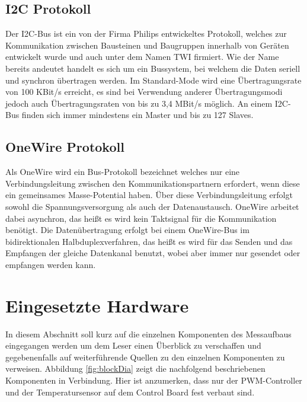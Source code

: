 \documentclass[a4paper,12pt]{scrartcl}
\begin{document}
\subsection{I2C Protokoll}

Der I2C-Bus ist ein von der Firma Philips entwickeltes Protokoll, welches zur Kommunikation zwischen Bausteinen und Baugruppen innerhalb von Geräten entwickelt wurde und auch unter dem Namen TWI firmiert. Wie der Name bereits andeutet handelt es sich um ein Bussystem, bei welchem die Daten seriell und synchron übertragen werden. Im Standard-Mode wird eine Übertragungsrate von 100 KBit/s erreicht, es sind bei Verwendung anderer Übertragungsmodi jedoch
auch Übertragungsraten von bis zu 3,4 MBit/s möglich. An einem I2C-Bus finden sich immer mindestens ein Master und bis zu 127 Slaves.\cite{speci2c}

\subsection{OneWire Protokoll}
Als OneWire wird ein Bus-Protokoll bezeichnet welches nur eine Verbindungsleitung zwischen den Kommunikationspartnern erfordert, wenn diese ein gemeinsames Masse-Potential haben. Über diese Verbindungsleitung erfolgt sowohl die Spannungsversorgung als auch der Datenaustausch. OneWire arbeitet dabei asynchron, das heißt es wird kein Taktsignal für die Kommunikation benötigt. Die Datenübertragung erfolgt bei einem OneWire-Bus im bidirektionalen Halbduplexverfahren, das heißt es wird für das Senden und das Empfangen der gleiche Datenkanal benutzt, wobei aber immer nur gesendet oder empfangen werden kann.\cite{spec1wire}

\clearpage
\section{Eingesetzte Hardware}
In diesem Abschnitt soll kurz auf die einzelnen Komponenten des Messaufbaus eingegangen werden um dem Leser einen Überblick zu verschaffen und gegebenenfalls auf weiterführende Quellen zu den einzelnen Komponenten zu verweisen. Abbildung \ref{fig:blockDia} zeigt die nachfolgend beschriebenen Komponenten in Verbindung. Hier ist anzumerken, dass nur der PWM-Controller und der Temperatursensor auf dem Control Board fest verbaut sind.
\end{document}
